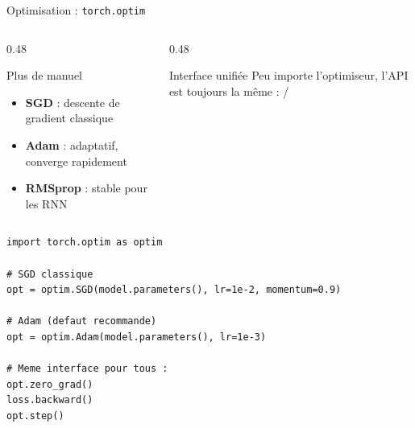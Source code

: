 \documentclass[aspectratio=169, 10pt]{beamer}
\begin{document}
\begin{frame}[fragile]{Optimisation : \texttt{torch.optim}}
  \begin{columns}[T]
    \begin{column}{0.48\textwidth}
      \begin{block}{Plus de  manuel}
        \begin{itemize}
          \item \textbf{SGD} : descente de gradient classique
          \item \textbf{Adam} : adaptatif, converge rapidement
          \item \textbf{RMSprop} : stable pour les RNN
        \end{itemize}
      \end{block}
    \end{column}
    \begin{column}{0.48\textwidth}
      \begin{exampleblock}{Interface unifiée}
        Peu importe l'optimiseur, l'API est toujours la même :
         / 
      \end{exampleblock}
    \end{column}
  \end{columns}
  \medskip
  \begin{lstlisting}[style=pythonstyle]
import torch.optim as optim

# SGD classique
opt = optim.SGD(model.parameters(), lr=1e-2, momentum=0.9)

# Adam (defaut recommande)
opt = optim.Adam(model.parameters(), lr=1e-3)

# Meme interface pour tous :
opt.zero_grad()
loss.backward()
opt.step()
  \end{lstlisting}
\end{frame}
\end{document}
